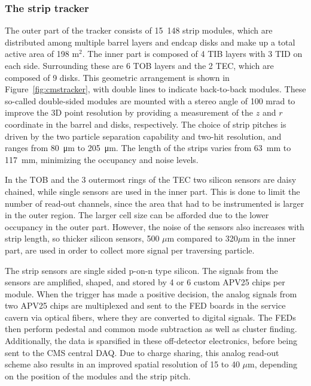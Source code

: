 \subsubsection{The strip tracker}

The outer part of the tracker consists of 15~148 strip modules, which are distributed among multiple barrel layers and endcap disks and make up a total active area of 198 m$^2$. The inner part is composed of 4 \ac{TIB} layers with 3 \ac{TID} on each side. Surrounding these are 6 \ac{TOB} layers and the 2 \ac{TEC}, which are composed of 9 disks. This geometric arrangement is shown in Figure~\ref{fig:cmstracker}, with double lines to indicate back-to-back modules. These so-called double-sided modules are mounted with a stereo angle of 100 mrad to improve the 3D point resolution by providing a measurement of the $z$ and $r$ coordinate in the barrel and disks, respectively. The choice of strip pitches is driven by the two particle separation capability and two-hit resolution, and ranges from \SI{80}{\micro m} to \SI{205}{\micro m}. The length of the strips varies from \SI{63}{mm} to \SI{117}{mm}, minimizing the occupancy and noise levels.

In the \ac{TOB} and the 3 outermost rings of the \ac{TEC} two silicon sensors are daisy chained, while single sensors are used in the inner part. This is done to limit the number of read-out channels, since the area that had to be instrumented is larger in the outer region. The larger cell size can be afforded  due to the lower occupancy in the outer part. However, the noise of the sensors also increases with strip length, so thicker silicon sensors, 500 $\mu$m compared to 320$\mu$m in the inner part, are used in order to collect more signal per traversing particle.

The strip sensors are single sided p-on-n type silicon. The signals from the sensors are amplified, shaped, and stored by 4 or 6 custom APV25 chips per module. When the trigger has made a positive decision, the analog signals from two APV25 chips are multiplexed and sent to the \ac{FED} boards in the service cavern via optical fibers, where they are converted to digital signals. The \acp{FED} then perform pedestal and common mode subtraction as well as cluster finding. Additionally, the data is sparsified in these off-detector electronics, before being sent to the CMS central \ac{DAQ}. Due to charge sharing, this analog read-out scheme also results in an improved spatial resolution of 15 to 40 $\mu$m, depending on the position of the modules and the strip pitch. 

